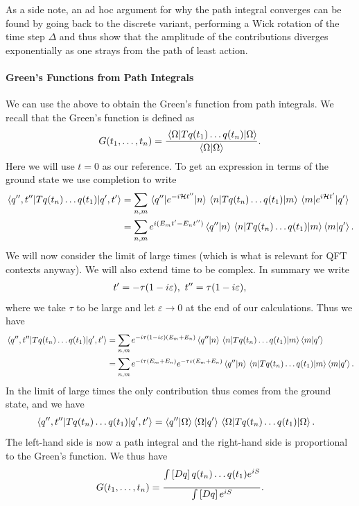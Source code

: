 As a side note, an ad hoc argument for why the path integral converges can be found by going back to the discrete variant, performing a Wick rotation of the time step $\Delta$ and thus show that the amplitude of the contributions diverges exponentially as one strays from the path of least action.

\paragraph{Green's Functions from Path Integrals}
We can use the above to obtain the Green's function from path integrals. We recall that the Green's function is defined as
\begin{align*}
	G(t_{1}, \dots, t_{n}) = \frac{\expval{\ensuremath{T}q(t_{1})\dots q(t_{n})}{\Omega}}{\braket{\Omega}}.
\end{align*}
Here we  will use $t = 0$ as our reference. To get an expression in terms of the ground state we use completion to write
\begin{align*}
	\mel{q^{\prime\prime}, t^{\prime\prime}}{\ensuremath{T}q(t_{n})\dots q(t_{1})}{q\ensuremath{^{\prime}}, t\ensuremath{^{\prime}}} &= \sum\limits_{n, m}\mel{q^{\prime\prime}}{e^{-i\ensuremath{\mathcal{H}}t^{\prime\prime}}}{n}\mel{n}{\ensuremath{T}q(t_{n})\dots q(t_{1})}{m}\mel{m}{e^{i\ensuremath{\mathcal{H}}t\ensuremath{^{\prime}}}}{q\ensuremath{^{\prime}}} \\
	&= \sum\limits_{n, m}e^{i(E_{m}t^{\prime} - E_{n}t^{\prime\prime})}\braket{q^{\prime\prime}}{n}\mel{n}{\ensuremath{T}q(t_{n})\dots q(t_{1})}{m}\braket{m}{q^{\prime}}.
\end{align*}
We will now consider the limit of large times (which is what is relevant for QFT contexts anyway). We will also extend time to be complex. In summary we write
\begin{align*}
	t^{\prime} = -\tau(1 - i\varepsilon),\ t^{\prime\prime} = \tau(1 - i\varepsilon),
\end{align*}
where we take $\tau$ to be large and let $\varepsilon\to 0$ at the end of our calculations. Thus we have
\begin{align*}
	\mel{q^{\prime\prime}, t^{\prime\prime}}{\ensuremath{T}q(t_{n})\dots q(t_{1})}{q\ensuremath{^{\prime}}, t\ensuremath{^{\prime}}} &= \sum\limits_{n, m}e^{-i\tau(1 - i\varepsilon)(E_{m} + E_{n})}\braket{q^{\prime\prime}}{n}\mel{n}{\ensuremath{T}q(t_{n})\dots q(t_{1})}{m}\braket{m}{q^{\prime}} \\
	&= \sum\limits_{n, m}e^{-i\tau(E_{m} + E_{n})}e^{-\tau\varepsilon(E_{m} + E_{n})}\braket{q^{\prime\prime}}{n}\mel{n}{\ensuremath{T}q(t_{n})\dots q(t_{1})}{m}\braket{m}{q^{\prime}}.
\end{align*}
In the limit of large times the only contribution thus comes from the ground state, and we have
\begin{align*}
	\mel{q^{\prime\prime}, t^{\prime\prime}}{\ensuremath{T}q(t_{n})\dots q(t_{1})}{q\ensuremath{^{\prime}}, t\ensuremath{^{\prime}}} &= \braket{q^{\prime\prime}}{\Omega}\braket{\Omega}{q^{\prime}}\mel{\Omega}{\ensuremath{T}q(t_{n})\dots q(t_{1})}{\Omega}.
\end{align*}
The left-hand side is now a path integral and the right-hand side is proportional to the Green's function. We thus have
\begin{align*}
	G(t_{1}, \dots, t_{n}) = \frac{\int\limits_{}\left[Dq\right]q(t_{n})\dots q(t_{1})e^{iS}}{\int\limits_{}\left[Dq\right]e^{iS}}.
\end{align*}

